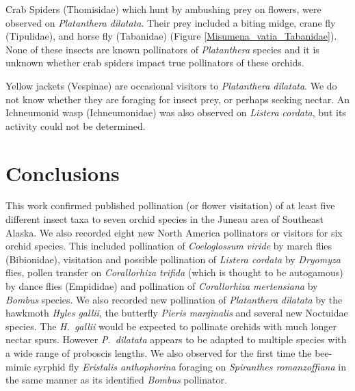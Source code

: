 \begin{multicols}{2} 













Crab Spiders (Thomisidae) which hunt by ambushing prey on flowers, were
observed on \emph{Platanthera dilatata}. Their prey included a biting
midge, crane fly (Tipulidae), and horse fly (Tabanidae) (Figure \ref{Misumena_vatia_Tabanidae}).
None of these insects are known pollinators of \emph{Platanthera}
species and it is unknown whether crab spiders impact true pollinators
of these orchids.




Yellow jackets (Vespinae) are occasional visitors to \emph{Platanthera
dilatata}. We do not know whether they are foraging for insect prey, or
perhaps seeking nectar. An Ichneumonid wasp (Ichneumonidae) was also
observed on \emph{Listera cordata}, but its activity could not be
determined.

\section{Conclusions}

This work confirmed published pollination (or flower visitation) of at
least five different insect taxa to seven orchid species in the Juneau
area of Southeast Alaska. We also recorded eight new North America
pollinators or visitors for six orchid species. This included
pollination of \emph{Coeloglossum viride} by march flies (Bibionidae),
visitation and possible pollination of \emph{Listera cordata} by
\emph{Dryomyza} flies, pollen transfer on \emph{Corallorhiza trifida} (which is thought to be autogamous) by dance flies (Empididae) and pollination of \emph{Corallorhiza mertensiana} by \emph{Bombus} species. We also recorded new pollination of \emph{Platanthera dilatata} by the hawkmoth \emph{Hyles gallii}, the butterfly \emph{Pieris marginalis} and several
new Noctuidae species. The \emph{H.\ gallii} would be expected to
pollinate orchids with much longer nectar spurs. However \emph{P.\
dilatata} appears to be adapted to multiple species with a wide range of
proboscis lengths. We also observed for the first time the bee-mimic
syrphid fly \emph{Eristalis anthophorina} foraging on \emph{Spiranthes
romanzoffiana} in the same manner as its identified \emph{Bombus}
pollinator.


\end{multicols}
